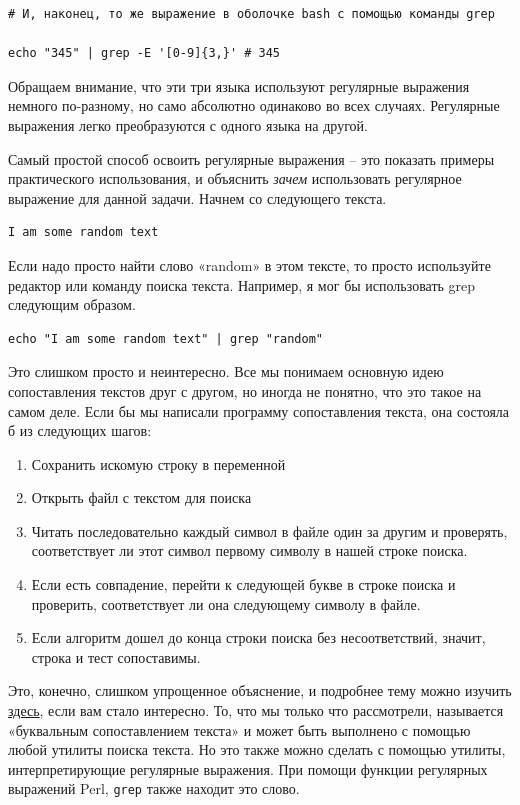 \documentclass[12pt]{article}
\providecommand{\tightlist}{%
  \setlength{\itemsep}{0pt}\setlength{\parskip}{0pt}}
\begin{document}
\begin{verbatim}
# И, наконец, то же выражение в оболочке bash с помощью команды grep

echo "345" | grep -E '[0-9]{3,}' # 345
\end{verbatim}

Обращаем внимание, что эти три языка используют регулярные выражения
немного по-разному, но само абсолютно одинаково во всех случаях.
Регулярные выражения легко преобразуются с одного языка на другой.

Самый простой способ освоить регулярные выражения -- это показать примеры
практического использования, и объяснить \emph{зачем} использовать
регулярное выражение для данной задачи. Начнем со следующего текста.

\begin{verbatim}
I am some random text
\end{verbatim}

Если надо просто найти слово «random» в этом тексте, то просто
используйте редактор или команду поиска текста. Например, я мог бы
использовать grep следующим образом.

\begin{verbatim}
echo "I am some random text" | grep "random"
\end{verbatim}

Это слишком просто и неинтересно. Все мы понимаем основную идею
сопоставления текстов друг с другом, но иногда не понятно, что это такое
на самом деле. Если бы мы написали программу сопоставления текста, она
состояла б из следующих шагов:

\begin{enumerate}
\tightlist
\item
  Сохранить искомую строку в переменной
\item
  Открыть файл с текстом для поиска
\item
  Читать последовательно каждый символ в файле один за другим и
  проверять, соответствует ли этот символ первому символу в нашей строке
  поиска.
\item
  Если есть совпадение, перейти к следующей букве в строке поиска и
  проверить, соответствует ли она следующему символу в файле.
\item
  Если алгоритм дошел до конца строки поиска без несоответствий, значит,
  строка и тест сопоставимы.
\end{enumerate}

Это, конечно, слишком упрощенное объяснение, и подробнее тему можно
изучить \href{https://stackoverflow.com/a/1627904/7437737}{здесь}, если
вам стало интересно. То, что мы только что рассмотрели, называется
«буквальным сопоставлением текста» и может быть выполнено с помощью
любой утилиты поиска текста. Но это также можно сделать с помощью
утилиты, интерпретирующие регулярные выражения. При помощи функции
регулярных выражений Perl, \texttt{grep} также находит это слово.
\end{document}
